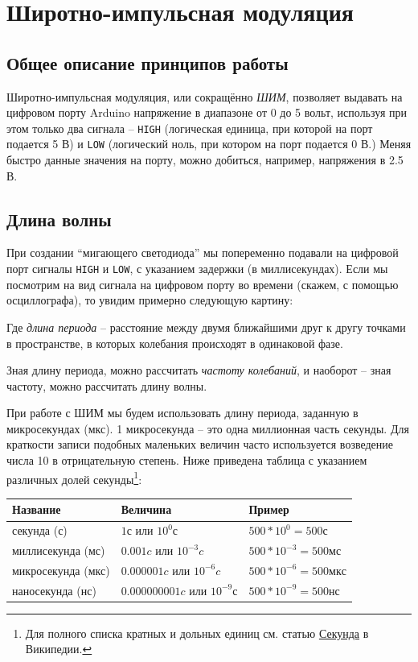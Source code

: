 \documentclass[a4paper,twoside]{book}
\begin{document}
\chapter{Широтно-импульсная модуляция}

\section{Общее описание принципов работы}

Широтно-импульсная модуляция, или сокращённо \emph{ШИМ}, позволяет выдавать на
цифровом порту Arduino напряжение в диапазоне от 0 до 5 вольт, используя при
этом только два сигнала -- \texttt{HIGH} (логическая единица, при которой на
порт подается 5 В) и \texttt{LOW} (логический ноль, при котором на порт подается
0 В.) Меняя быстро данные значения на порту, можно добиться, например,
напряжения в 2.5 В.

\section{Длина волны}

При создании ``мигающего светодиода'' мы попеременно подавали на цифровой порт
сигналы \texttt{HIGH} и \texttt{LOW}, с указанием задержки (в миллисекундах).
Если мы посмотрим на вид сигнала на цифровом порту во времени (скажем, с помощью
осциллографа), то увидим примерно следующую картину:


Где \emph{длина периода} -- расстояние между двумя ближайшими друг к другу
точками в пространстве, в которых колебания происходят в одинаковой фазе.

Зная длину периода, можно рассчитать \emph{частоту колебаний}, и наоборот --
зная частоту, можно рассчитать длину волны.

При работе с ШИМ мы будем использовать длину периода, заданную в микросекундах
(мкс). 1 микросекунда -- это одна миллионная часть секунды. Для краткости записи
подобных маленьких величин часто используется возведение числа 10 в
отрицательную степень. Ниже приведена таблица с указанием различных долей
секунды\footnote{Для полного списка кратных и дольных единиц см. статью
\href{https://ru.wikipedia.org/wiki/\%D0\%A1\%D0\%B5\%D0\%BA\%D1\%83\%D0\%BD\%D0\%B4\%D0\%B0}{Секунда}
в Википедии.}:

\begin{tabular}{p{4cm}|p{4cm}|p{6cm}}
  Название & Величина & Пример \\
  \hline \hline
  секунда (с) & $ 1 с $ или $ 10^0 с $ & $ 500 * 10^{0} = 500 с $ \\
  \hline
  миллисекунда (мс) & $ 0.001 c $ или $ 10^{-3} c $ & $ 500 * 10^{-3} = 500 мс $ \\
  \hline
  микросекунда (мкс) & $ 0.000001 c $ или $ 10^{-6} c $ & $ 500 * 10^{-6} = 500 мкс $ \\
  \hline
  наносекунда (нс) & $ 0.000000001 c $ или $ 10^{-9} с $ & $ 500 * 10^{-9} = 500 нс $
\end{tabular}
\end{document}

